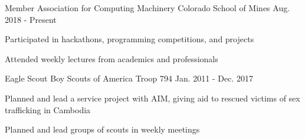 

\begin{cventries}
  \cventry
    {Member}
    {Association for Computing Machinery}
    {Colorado School of Mines}
    {Aug. 2018 - Present}
    {
      \begin{cvitems}
        \item{Participated in hackathons, programming competitions, and projects}
        \item{Attended weekly lectures from academics and professionals}
      \end{cvitems}
    }

  \cventry
    {Eagle Scout}
    {Boy Scouts of America}
    {Troop 794}
    {Jan. 2011 - Dec. 2017}
    {
      \begin{cvitems}
        \item{Planned and lead a service project with AIM, giving aid to rescued victims of sex trafficking in Cambodia}
        \item{Planned and lead groups of scouts in weekly meetings}
      \end{cvitems}
    }


\end{cventries}
